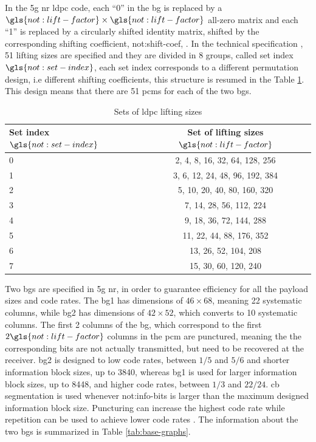 In the \gls{5g} \gls{nr} \gls{ldpc} code, each ``0'' in the \gls{bg} is replaced by a $\gls{not:lift-factor} \times \gls{not:lift-factor} $ all-zero matrix and each ``1'' is replaced by a circularly shifted identity matrix, shifted by the corresponding shifting coefficient, \gls{not:shift-coef}, \cite{ErikDahlman5G}.
%
In the technical specification \cite{3gpp.38.212}, 51 lifting sizes are specified and they are divided in 8 groups, called set index $\gls{not:set-index}$, each set index corresponds to a different permutation design, i.e different shifting coefficients, this structure is resumed in the Table \ref{tab:lift-table}.
%
This design means that there are 51 \glspl{pcm} for each of the two \glspl{bg}.

\begin{table}[htb]
\centering
\caption{Sets of \gls{ldpc} lifting sizes}
\label{tab:lift-table}
\begin{tabular}{l c}
  \toprule
  Set index $\gls{not:set-index}$   & Set of lifting sizes $\gls{not:lift-factor}$ \\
  \midrule
  0  &  2, 4, 8, 16, 32, 64, 128, 256 \\
  1  &  3, 6, 12, 24, 48, 96, 192, 384 \\
  2  &  5, 10, 20, 40, 80, 160, 320 \\
  3  &  7, 14, 28, 56, 112, 224 \\
  4  &  9, 18, 36, 72, 144, 288 \\
  5  &  11, 22, 44, 88, 176, 352 \\
  6  &  13, 26, 52, 104, 208 \\
  7  &  15, 30, 60, 120, 240 \\
  \bottomrule
\end{tabular}
\end{table}


Two \glspl{bg} are specified in \gls{5g} \gls{nr}, in order to guarantee efficiency for all the payload sizes and code rates.
%
The \gls{bg}1 has dimensions of $46 \times 68$, meaning 22 systematic columns, while \gls{bg}2 has dimensions of $42 \times 52$, which converts to 10 systematic columns.
%
The first 2 columns of the \gls{bg}, which correspond to the first $2 \gls{not:lift-factor}$ columns in the \gls{pcm} are punctured, meaning the the corresponding bits are not actually transmitted, but need to be recovered at the receiver.
%
\Gls{bg}2 is designed to low code rates, between $1/5$ and $5/6$ and shorter information block sizes, up to 3840, whereas \gls{bg}1 is used for larger information block sizes, up to 8448, and higher code rates, between $1/3$ and $22/24$.
%
\Gls{cb} segmentation is used whenever \gls{not:info-bits} is larger than the maximum designed information block size.
%
Puncturing can increase the highest code rate while repetition can be used to achieve lower code rates \cite{ErikDahlman5G,AliZaidi632018,Hui2018}.
%
The information about the two \glspl{bg} is summarized in Table \ref{tab:base-graphs}.

